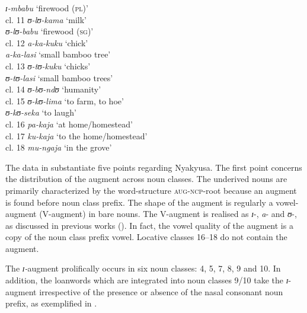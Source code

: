 \documentclass[output=paper]{langscibook}
\begin{document}
\begin{tabbing}
   \> \textit{ɪ{}-mbabu} \> ‘firewood (\textsc{pl})’\\
  cl. 11  \> \textit{ʊ{}-lʊ{}-kama} \> ‘milk’  \\
   \> \textit{ʊ{}-lʊ{}-babu} \> ‘firewood (\textsc{sg})’  \\
  cl. 12 \> \textit{a-ka-kuku} \> ‘chick’ \\
   \> \textit{a-ka-lasi} \> ‘small bamboo tree’      \\
  cl. 13 \> \textit{ʊ{}-tʊ{}-kuku} \> ‘chicks’ \\
   \> \textit{ʊ{}-tʊ{}-lasi} \> ‘small bamboo trees’  \\
  cl. 14 \> \textit{ʊ{}-bʊ-ndʊ} \> ‘humanity’ \\
  cl. 15 \> \textit{ʊ{}-kʊ{}-lima} \> ‘to farm, to hoe’ \\
   \> \textit{ʊ{}-kʊ{}-seka} \> ‘to laugh’\\
  cl. 16 \> \textit{pa-kaja} \> ‘at home/homestead’ \\
  cl. 17 \> \textit{ku-kaja} \> ‘to the home/homestead’ \\
  cl. 18 \> \textit{mu{}-ngaja} \> ‘in the grove’
\end{tabbing}
\z

The data in  substantiate five points regarding Nyakyusa. The first point concerns the distribution of the augment across noun classes. The underived nouns are primarily characterized by the word-structure \textsc{aug-ncp}-root because an augment is found before noun class prefix. The shape of the augment is regularly a vowel-augment (V-aug\-ment) in bare nouns. The V-aug\-ment is realised as \textit{ɪ}{}-, \textit{a}{}- and \textit{ʊ}{}-, as discussed  in previous works (\citealt{DeBlois1970, Felberg1996, Lusekelo2009, Lusekelo2013, Mbope2016, Persohn2017}). In fact, the vowel quality of the augment is a copy of the noun class prefix vowel. Locative classes 16--18 do not contain the augment.  

The \textit{ɪ{}-}augment prolifically occurs in six noun classes: 4, 5, 7, 8, 9 and 10. In addition, the loanwords which are integrated into noun classes 9/10 take the \textit{ɪ}{}-augment irrespective of the presence or absence of the nasal consonant noun prefix, as exemplified in . 
\end{document}
